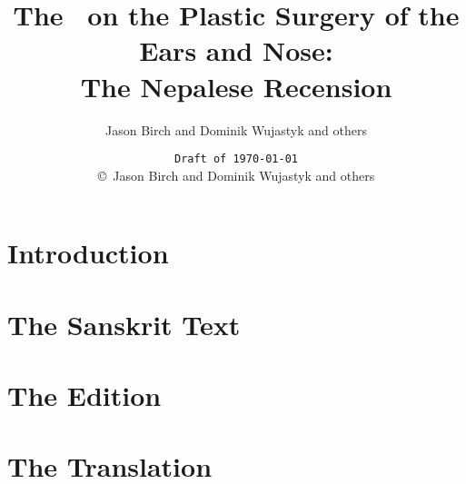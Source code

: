\documentclass[12pt,draft]{article} %
\title{The \SS\ on the Plastic Surgery of the Ears and Nose:\\ The Nepalese 
Recension}
\author{Jason Birch and Dominik Wujastyk and others}
\date{\texttt{Draft of \today}\\ \copyright\ Jason Birch and Dominik Wujastyk and 
others}
\begin{document}
 
    
    
    \pagecolor{cyan}
  
    \maketitle
    \pagecolor{white}
%     
    \tableofcontents
\newpage
    \section{Introduction}
\newpage
    \section{The Sanskrit Text}
\newpage
    \section{The Edition}
\newpage
    \section{The Translation}
\newpage
%    
    
    
\end{document}
